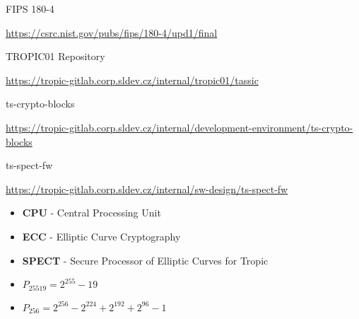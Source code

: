 \documentclass{tropic_design_spec}
\begin{document}
\begin{thebibliography}{9}

{FIPS 180-4}

\url{https://csrc.nist.gov/pubs/fips/180-4/upd1/final}

{TROPIC01 Repository}

\url{https://tropic-gitlab.corp.sldev.cz/internal/tropic01/tassic}

{ts-crypto-blocks}

\url{https://tropic-gitlab.corp.sldev.cz/internal/development-environment/ts-crypto-blocks}

{ts-spect-fw}

\url{https://tropic-gitlab.corp.sldev.cz/internal/sw-design/ts-spect-fw}


\end{thebibliography}



\pagebreak
\tableofcontents



\begin{itemize}
    \item{\textbf{CPU} - Central Processing Unit}
    \item{\textbf{ECC} - Elliptic Curve Cryptography}
    \item{\textbf{SPECT} - Secure Processor of Elliptic Curves for Tropic}
    \item{$P_{25519} = 2^{255} - 19$}
    \item{$P_{256} = 2^{256} - 2^{224} + 2^{192} + 2^{96} - 1$}
\end{itemize}
\end{document}
